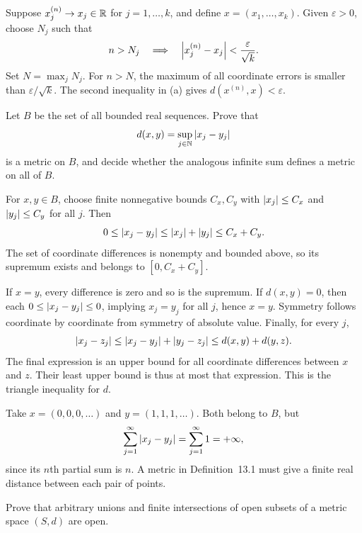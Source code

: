 Suppose $x_j^{(n)}\to x_j\in\mathbb{R}$ for $j=1,\ldots,k$,
and define $x=(x_1,\ldots,x_k)$. Given $\varepsilon>0$,
choose $N_j$ such that
\[
 n>N_j\quad\Longrightarrow\quad
 \left|x_j^{(n)}-x_j\right|<\frac{\varepsilon}{\sqrt{k}}.
\]
Set $N=\max_jN_j$. For $n>N$, the maximum of all coordinate
errors is smaller than $\varepsilon/\sqrt{k}$. The second
inequality in (a) gives $d(x^{(n)},x)<\varepsilon$.

\goal Let $B$ be the set of all bounded real sequences. Prove
that
\[
 d(x,y)=\sup_{j\in\mathbb{N}}\left|x_j-y_j\right|
\]
is a metric on $B$, and decide whether the analogous infinite sum
defines a metric on all of $B$.

For $x,y\in B$, choose finite nonnegative bounds $C_x,C_y$
with $\left|x_j\right|\le C_x$ and $\left|y_j\right|\le C_y$ for all $j$.
Then
\[
 0\le\left|x_j-y_j\right|\le\left|x_j\right|+\left|y_j\right|\le C_x+C_y.
\]
The set of coordinate differences is nonempty and bounded above,
so its supremum exists and belongs to $[0,C_x+C_y]$.

If $x=y$, every difference is zero and so is the supremum.
If $d(x,y)=0$, then each $0\le\left|x_j-y_j\right|\le0$, implying
$x_j=y_j$ for all $j$, hence $x=y$. Symmetry follows coordinate
by coordinate from symmetry of absolute value. Finally, for every $j$,
\[
 \left|x_j-z_j\right|\le\left|x_j-y_j\right|+\left|y_j-z_j\right|
 \le d(x,y)+d(y,z).
\]
The final expression is an upper bound for all coordinate
differences between $x$ and $z$. Their least upper bound is thus
at most that expression. This is the triangle inequality for $d$.

Take $x=(0,0,0,\ldots)$ and $y=(1,1,1,\ldots)$.
Both belong to $B$, but
\[
 \sum_{j=1}^{\infty}\left|x_j-y_j\right|
 =\sum_{j=1}^{\infty}1=+\infty,
\]
since its $n$th partial sum is $n$. A metric in Definition~13.1
must give a finite real distance between each pair of points.

\goal Prove that arbitrary unions and finite intersections of
open subsets of a metric space $(S,d)$ are open.


